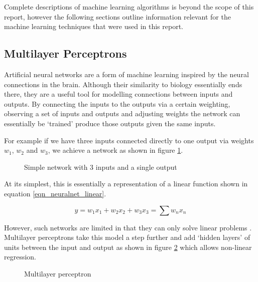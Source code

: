 Complete descriptions of machine learning algorithms is beyond the scope of this report, however
the following sections outline information relevant for the machine learning techniques
that were used in this report.

\subsection{Multilayer Perceptrons}
Artificial neural networks are a form of machine learning inspired by the neural connections
in the brain. Although their similarity to biology essentially ends there, they are a useful
tool for modelling connections between inputs and outputs. By connecting the inputs to the
outputs via a certain weighting, observing a set of inputs and outputs and adjusting weights
the network can essentially be `trained' produce those outputs given the same inputs.

For example if we have three inputs connected directly to one output via
weights $w_1$, $w_2$ and $w_3$, we achieve a network as shown in figure \ref{fig_neuralnet1}.

\begin{figure}[h!]
\caption{Simple network with 3 inputs and a single output}
\label{fig_neuralnet1}
\end{figure}


At its simplest, this is essentially a representation of a linear function shown
in equation \ref{eqn_neuralnet_linear}.

\begin{equation}
\label{eqn_neuralnet_linear}
y = w_1x_1 + w_2x_2 + w_3x_3 =  \sum w_nx_n
\end{equation}

However, such networks are limited in that they can only solve linear
problems \cite{intro_to_machine_learning_2010}. Multilayer
perceptrons take this model a step further and add `hidden layers' of units between the
input and output as shown in figure \ref{fig_neuralnet2} which allows non-linear regression.

\begin{figure}[h!]
\caption{Multilayer perceptron}
\label{fig_neuralnet2}
\end{figure}

